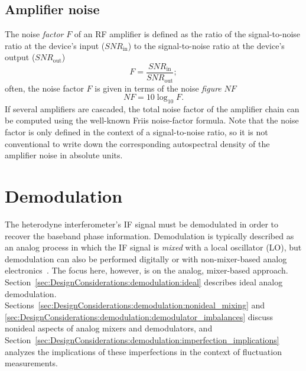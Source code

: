 \subsection{Amplifier noise}
The noise \emph{factor} $F$ of an RF amplifier is defined as the ratio of
the signal-to-noise ratio at the device's input ($SNR_{\text{in}}$) to
the signal-to-noise ratio at the device's output ($SNR_{\text{out}}$)
\begin{equation}
  F = \frac{SNR_{\text{in}}}{SNR_{\text{out}}};
\end{equation}
often, the noise factor $F$ is given
in terms of the noise \emph{figure} $NF$
\cite{minicircuits_amplifier_terms_defined}
\begin{equation}
  NF = 10 \log_{10} F.
\end{equation}
If several amplifiers are cascaded,
the total noise factor of the amplifier chain
can be computed using the well-known Friis noise-factor formula.
Note that the noise factor is only defined
in the context of a signal-to-noise ratio, so
it is not conventional to write down the corresponding
autospectral density of the amplifier noise in absolute units.


\section{Demodulation}
\label{sec:DesignConsiderations:demodulation}
The heterodyne interferometer's IF signal must be demodulated
in order to recover the baseband phase information.
Demodulation is typically described as an analog process
in which the IF signal is \emph{mixed} with a local oscillator (LO), but
demodulation can also be performed digitally
\cite{vanzeeland_rsi08, mlynek_fst12} or
with non-mixer-based analog electronics~\cite{mlynek_rsi17}.
The focus here, however, is on the analog, mixer-based approach.
Section~\ref{sec:DesignConsiderations:demodulation:ideal}
describes ideal analog demodulation.
Sections~\ref{sec:DesignConsiderations:demodulation:nonideal_mixing} and
\ref{sec:DesignConsiderations:demodulation:demodulator_imbalances}
discuss nonideal aspects of analog mixers and demodulators, and
Section~\ref{sec:DesignConsiderations:demodulation:imperfection_implications}
analyzes the implications of these imperfections
in the context of fluctuation measurements.


